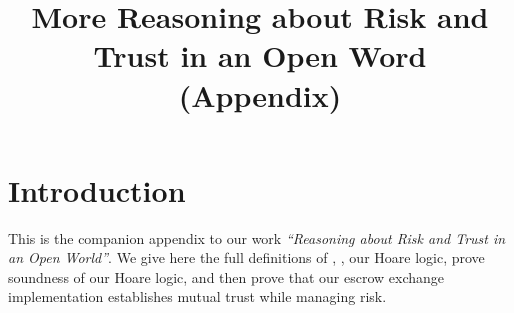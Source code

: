 \documentclass[preprint,10pt,nocopyrightspace]{sigplanconf}
\begin{document}
 \title{More Reasoning about Risk and Trust  in an Open Word\\
(Appendix)}

\maketitle






\section{Introduction}

This is the companion appendix to our work \textit{``Reasoning about
  Risk and Trust in an Open World''}. We give here the full
definitions of \LangOO, \Chainmail, our Hoare logic, prove 
soundness of our Hoare logic, and then prove that our escrow exchange
implementation establishes mutual trust while managing risk.




 
 

 

%  



\setlength{\bibsep}{0.0pt}

\end{document}
